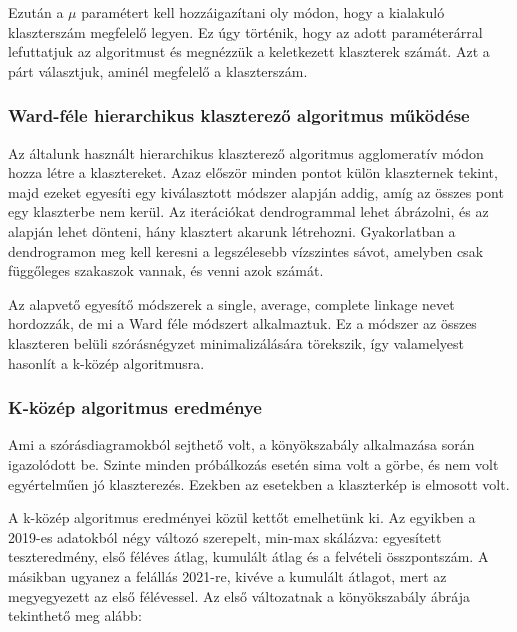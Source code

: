 \documentclass[12pt]{article}
\begin{document}
Ezután a $\mu$ paramétert kell hozzáigazítani oly módon, hogy a kialakuló klaszterszám megfelelő legyen. Ez úgy történik, hogy az adott paraméterárral lefuttatjuk az algoritmust és megnézzük a keletkezett klaszterek számát. Azt a párt választjuk, aminél megfelelő a klaszterszám.

\subsubsection{Ward-féle hierarchikus klaszterező algoritmus működése}

Az általunk használt hierarchikus klaszterező algoritmus agglomeratív módon hozza létre a klasztereket. Azaz először minden pontot külön klaszternek tekint, majd ezeket egyesíti egy kiválasztott módszer alapján addig, amíg az összes pont egy klaszterbe nem kerül. Az iterációkat dendrogrammal lehet ábrázolni, és az alapján lehet dönteni, hány klasztert akarunk létrehozni. Gyakorlatban a dendrogramon meg kell keresni a legszélesebb vízszintes sávot, amelyben csak függőleges szakaszok vannak, és venni azok számát.

Az alapvető egyesítő módszerek a single, average, complete linkage nevet hordozzák, de mi a Ward féle módszert alkalmaztuk. Ez a módszer az összes klaszteren belüli szórásnégyzet minimalizálására törekszik, így valamelyest hasonlít a k-közép algoritmusra.

\subsubsection{K-közép algoritmus eredménye}
Ami a szórásdiagramokból sejthető volt, a könyökszabály alkalmazása során igazolódott be. Szinte minden próbálkozás esetén sima volt a görbe, és nem volt egyértelműen jó klaszterezés. Ezekben az esetekben a klaszterkép is elmosott volt.

A k-közép algoritmus eredményei közül kettőt emelhetünk ki. Az egyikben a 2019-es adatokból négy változó szerepelt, min-max skálázva: egyesített teszteredmény, első féléves átlag, kumulált átlag és a felvételi összpontszám. A másikban ugyanez a felállás 2021-re, kivéve a kumulált átlagot, mert az megyegyezett az első félévessel. Az első változatnak a könyökszabály ábrája tekinthető meg alább:
\end{document}
